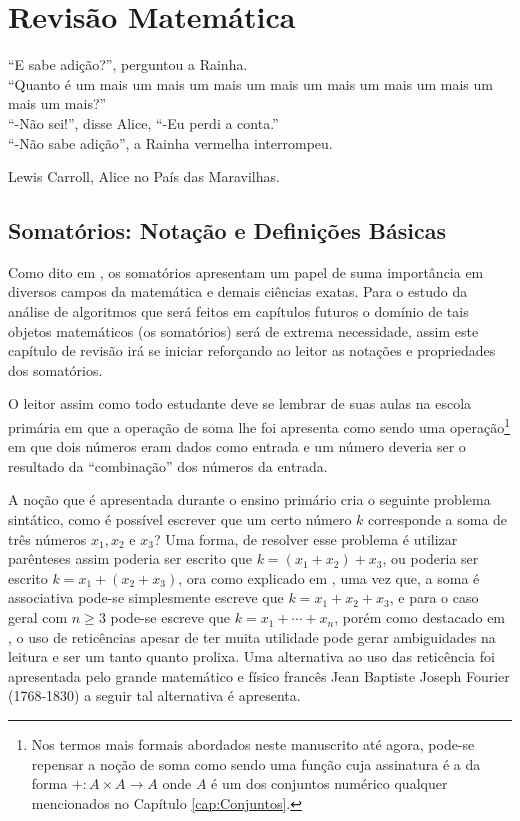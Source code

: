\chapter{Revisão Matemática}\label{cap:ComplexidadeRevisao}


\epigraph{``E sabe adição?'', perguntou a Rainha.\\``Quanto é um mais um mais um mais um mais um mais um mais um mais um mais um mais?''\\ ``-Não sei!'', disse Alice, ``-Eu perdi a conta.''\\ ``-Não sabe adição'', a Rainha vermelha interrompeu.}{Lewis Carroll, Alice no País das Maravilhas.}

\section{Somatórios: Notação e Definições Básicas}

Como dito em \cite{carmo2013}, os somatórios apresentam um papel de suma importância em diversos campos da matemática e demais ciências exatas. Para o estudo da análise de algoritmos que será feitos em capítulos futuros o domínio de tais objetos matemáticos (os somatórios) será de extrema necessidade, assim este capítulo de revisão irá se iniciar reforçando ao leitor as notações e propriedades dos somatórios.

O leitor assim como todo estudante deve se lembrar de suas aulas na escola primária em que a operação de soma lhe foi apresenta como sendo uma operação\footnote{Nos termos mais formais abordados neste manuscrito até agora, pode-se repensar a noção de soma como sendo uma função cuja assinatura é a da forma $+: A \times A \rightarrow A$ onde $A$ é um dos conjuntos numérico qualquer mencionados no Capítulo \ref{cap:Conjuntos}.} em que dois números eram dados como entrada e um número deveria ser o resultado da ``combinação'' dos números da entrada. 

A noção que é apresentada durante o ensino primário cria o seguinte problema sintático, como é possível escrever que um certo número $k$ corresponde a soma de três números $x_1, x_2$ e $x_3$? Uma forma, de resolver esse problema é utilizar parênteses assim poderia ser escrito que  $k = (x_1 + x_2) + x_3$, ou poderia ser escrito $k = x_1 + (x_2 + x_3)$,  ora como explicado em \cite{carmo2013, knuth-livro}, uma vez que, a soma é associativa pode-se simplesmente escreve que $k = x_1 + x_2 + x_3$, e para o caso geral com $n \geq 3$ pode-se escreve que $k = x_1 + \cdots + x_n$, porém como destacado em \cite{knuth-livro}, o uso de reticências apesar de ter muita utilidade pode gerar ambiguidades na leitura e ser um tanto quanto prolixa. Uma alternativa ao uso das reticência foi apresentada pelo grande matemático e físico francês Jean Baptiste Joseph Fourier (1768-1830) a seguir tal alternativa é apresenta.

